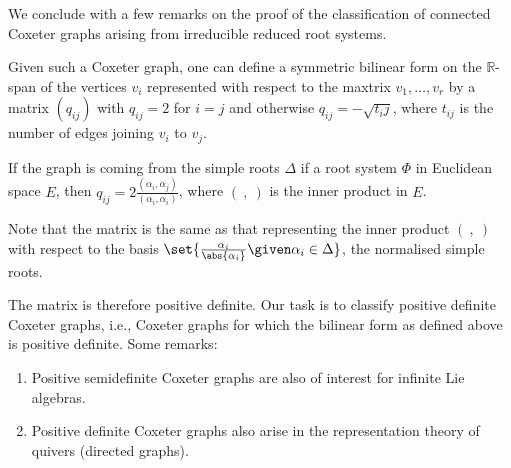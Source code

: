 We conclude with a few remarks on the proof of the classification of connected
Coxeter graphs arising from irreducible reduced root systems.

Given such a Coxeter graph, one can define a symmetric bilinear form on the
$\mathbb{R}$-span of the vertices $v_i$ represented with respect to the maxtrix
$v_1, \ldots, v_r$ by a matrix $(q_{ij})$ with $q_{ij} = 2$ for $i = j$ and otherwise
$q_{ij} = -\sqrt{t_ij}$, where $t_{ij}$ is the number of edges joining $v_i$ to
$v_j$.

If the graph is coming from the simple roots $\Delta$ if a root system $\Phi$ in
Euclidean space $E$, then $q_{ij} = 2\frac{(\alpha_i, \alpha_j)}{(\alpha_i, \alpha_i)}$,
where $(\ ,\ )$ is the inner product in $E$.

Note that the matrix is the same as that representing the inner product
$(\ ,\ )$ with respect to the basis $\set{\frac{\alpha_i}{\abs{\alpha_i}}\given \alpha_i \in \Delta}$,
the normalised simple roots.

The matrix is therefore positive definite. Our task is to classify positive definite
Coxeter graphs, i.e., Coxeter graphs for which the bilinear form as defined above
is positive definite. Some remarks:
\begin{enumerate}
	\item Positive semidefinite Coxeter graphs are also of interest for infinite
		Lie algebras.
	\item Positive definite Coxeter graphs also arise in the representation theory
		of quivers (directed graphs).
\end{enumerate}
